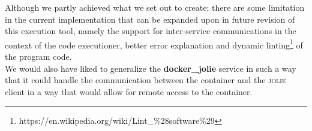 \documentclass[12pt]{article}
\newcommand{\jolie}[0] {\textsc{jolie}}
\begin{document}
Although we partly achieved what we set out to create; there are some limitation in the current implementation that can be expanded upon in future revision of this execution tool, namely the support for inter-service communications in the context of the code executioner, better error explanation and dynamic linting\footnote{https://en.wikipedia.org/wiki/Lint\_\%28software\%29} of the program code.\\

\noindent{}We would also have liked to generalize the \textbf{docker\_jolie} service in such a way that it could handle the communication between the container and the \jolie{} client in a way that would allow for remote access to the container.

 

\end{document}
